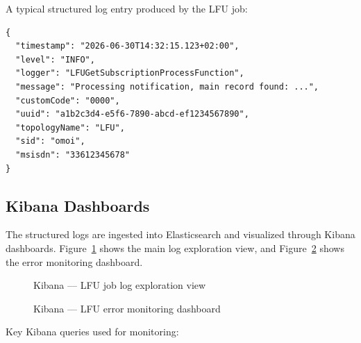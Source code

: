 A typical structured log entry produced by the LFU job:

\begin{lstlisting}[caption={Structured JSON log entry example}]
{
  "timestamp": "2026-06-30T14:32:15.123+02:00",
  "level": "INFO",
  "logger": "LFUGetSubscriptionProcessFunction",
  "message": "Processing notification, main record found: ...",
  "customCode": "0000",
  "uuid": "a1b2c3d4-e5f6-7890-abcd-ef1234567890",
  "topologyName": "LFU",
  "sid": "omoi",
  "msisdn": "33612345678"
}
\end{lstlisting}

\subsection{Kibana Dashboards}

The structured logs are ingested into Elasticsearch and visualized through Kibana dashboards. Figure~\ref{fig:kibana-logs} shows the main log exploration view, and Figure~\ref{fig:kibana-errors} shows the error monitoring dashboard.

\begin{figure}[H]
    \centering
    \caption{Kibana --- LFU job log exploration view}
    \label{fig:kibana-logs}
\end{figure}

\begin{figure}[H]
    \centering
    \caption{Kibana --- LFU error monitoring dashboard}
    \label{fig:kibana-errors}
\end{figure}

Key Kibana queries used for monitoring:


